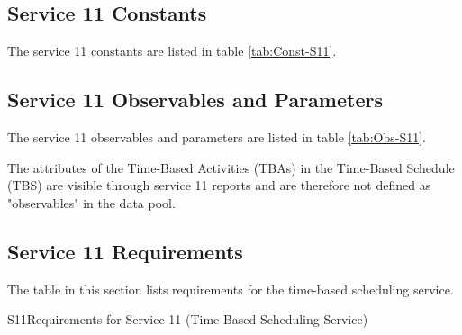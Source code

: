 \documentclass{pnp_article}
\begin{document}
\newpage
{}

\newpage
{}



\subsection{Service 11 Constants}\label{sec:serv11Const}
The service 11 constants are listed in table \ref{tab:Const-S11}.    



\subsection{Service 11 Observables and Parameters}\label{sec:serv11ObsPar}
The service 11 observables and parameters are listed in table \ref{tab:Obs-S11}.

The attributes of the Time-Based Activities (TBAs) in the Time-Based Schedule (TBS) are visible through service 11 reports and are therefore not defined as "observables" in the data pool.



\subsection{Service 11 Requirements}
The table in this section lists requirements for the time-based scheduling service.

\begin{crReq}{S11}{Requirements for Service 11 (Time-Based Scheduling Service)}
\end{crReq}


\end{document}
